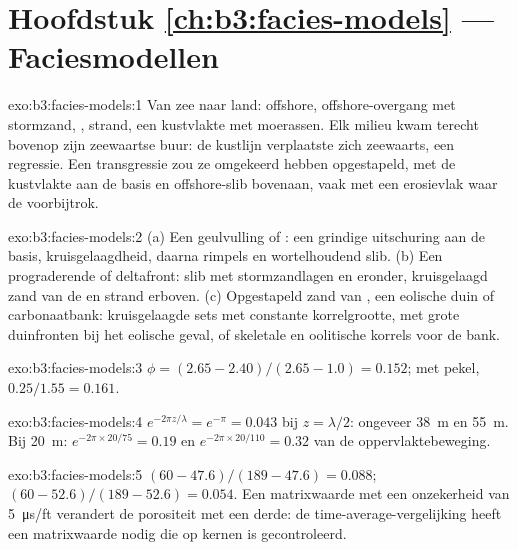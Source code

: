 \section*{Hoofdstuk \ref{ch:b3:facies-models} --- Faciesmodellen}

\begin{solution}{exo:b3:facies-models:1}
Van zee naar land: offshore, offshore-overgang met stormzand,
, strand, een kustvlakte met moerassen. Elk milieu kwam terecht
bovenop zijn zeewaartse buur: de kustlijn verplaatste zich zeewaarts, een regressie. Een
transgressie zou ze omgekeerd hebben opgestapeld, met de kustvlakte aan de
basis en offshore-slib bovenaan, vaak met een erosievlak waar de
 voorbijtrok.
\end{solution}

\begin{solution}{exo:b3:facies-models:2}
(a) Een geulvulling of : een grindige uitschuring aan de basis, kruisgelaagdheid,
daarna rimpels en wortelhoudend slib. (b) Een prograderende  of deltafront:
slib met stormzandlagen en  eronder,
kruisgelaagd zand van de  en strand erboven. (c) Opgestapeld zand van ,
een eolische duin of carbonaatbank: kruisgelaagde sets met constante korrelgrootte,
met grote duinfronten bij het eolische geval, of skeletale en oolitische
korrels voor de bank.
\end{solution}

\begin{solution}{exo:b3:facies-models:3}
$\phi = (2.65 - 2.40)/(2.65 - 1.0) = 0.152$; met pekel,
$0.25/1.55 = 0.161$.
\end{solution}

\begin{solution}{exo:b3:facies-models:4}
$e^{-2\pi z/\lambda} = e^{-\pi} = 0.043$ bij $z = \lambda/2$: ongeveer
\qty{38}{m} en \qty{55}{m}. Bij \qty{20}{m}: $e^{-2\pi\times20/75} = 0.19$
en $e^{-2\pi\times20/110} = 0.32$ van de oppervlaktebeweging.
\end{solution}

\begin{solution}{exo:b3:facies-models:5}
$(60 - 47.6)/(189 - 47.6) = 0.088$; $(60 - 52.6)/(189 - 52.6) = 0.054$. Een
matrixwaarde met een onzekerheid van \qty{5}{\micro\second/ft} verandert
de porositeit met een derde: de time-average-vergelijking heeft een matrixwaarde nodig die op kernen is gecontroleerd.
\end{solution}

